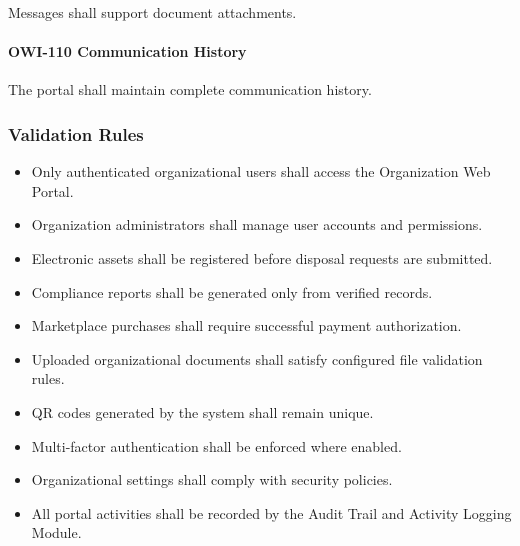 Messages shall support document attachments.

\paragraph{OWI-110 Communication History}

The portal shall maintain complete communication history.


\subsubsection*{Validation Rules}

\begin{itemize}

\item Only authenticated organizational users shall access the
Organization Web Portal.

\item Organization administrators shall manage user accounts and
permissions.

\item Electronic assets shall be registered before disposal requests are
submitted.

\item Compliance reports shall be generated only from verified records.

\item Marketplace purchases shall require successful payment
authorization.

\item Uploaded organizational documents shall satisfy configured file
validation rules.

\item QR codes generated by the system shall remain unique.

\item Multi-factor authentication shall be enforced where enabled.

\item Organizational settings shall comply with security policies.

\item All portal activities shall be recorded by the Audit Trail and
Activity Logging Module.

\end{itemize}


